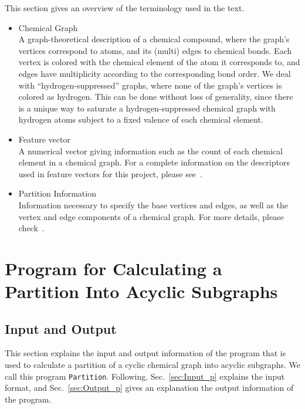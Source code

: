 \documentclass[11pt,titlepage,dvipdfmx,twoside]{article}
\begin{document}
This section gives an overview of the terminology used in the text.
%
\begin{itemize}
%
\item Chemical Graph\\
A graph-theoretical description of a chemical compound, 
where the graph's vertices correspond to atoms, and
its (multi) edges to chemical bonds.
Each vertex is colored with the chemical element of the atom it corresponds to,
and edges have multiplicity according to the corresponding bond order.
We deal with ``hydrogen-suppressed'' graphs, 
where none of the graph's vertices is colored as hydrogen.
This can be done without loss of generality,
since there is a unique way to saturate a hydrogen-suppressed chemical graph 
with hydrogen atoms subject to a fixed valence of each chemical element.


\item Feature vector\\
A numerical vector giving information such as the count of
each chemical element in a chemical graph.
For a complete information on the descriptors used in feature vectors for
this project, please see~\cite{branch}.



\item Partition Information\\
Information necessary to specify the base vertices and edges, as well as the vertex and edge components
of a chemical graph.
For more details, please check~\cite{branch}.



\end{itemize}

\section{Program for Calculating a Partition Into Acyclic Subgraphs}
\label{sec: partition}

\subsection{Input and Output}
\label{sec:InOut_p}

This section explains the input and output information of the 
program that is used to calculate a partition of a cyclic chemical graph
into acyclic subgraphs.
We call this program {\tt Partition}.
Following,
Sec.~\ref{sec:Input_p} explains the input format, and
Sec.~\ref{sec:Output_p} gives an explanation the output information of the program.
\end{document}
